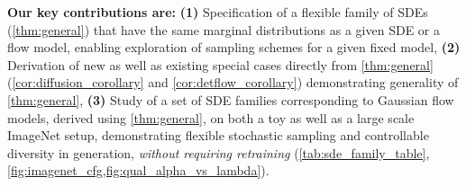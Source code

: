 \textbf{Our key contributions are:}
\textbf{(1)} Specification of a flexible family of SDEs (\cref{thm:general}) that have the same marginal distributions as a given SDE or a flow model, enabling exploration of sampling schemes for a given fixed model,
\textbf{(2)} Derivation of new as well as existing special cases directly from \cref{thm:general} (\cref{cor:diffusion_corollary} and \cref{cor:detflow_corollary}) demonstrating generality of \cref{thm:general},
\textbf{(3)} Study of a set of SDE families corresponding to Gaussian flow models, derived using \cref{thm:general}, on both a toy as well as a large scale ImageNet setup, demonstrating flexible stochastic sampling and controllable diversity in generation, \emph{without requiring retraining} (\cref{tab:sde_family_table}, \cref{fig:imagenet_cfg,fig:qual_alpha_vs_lambda}).
